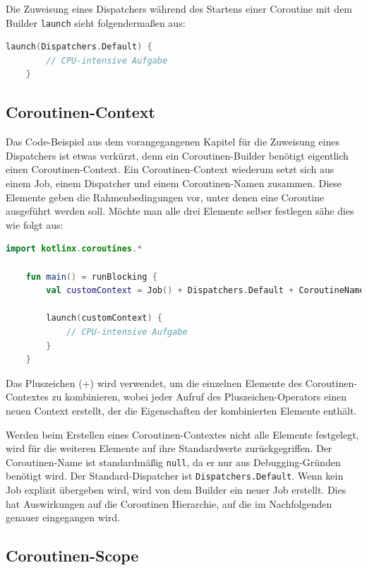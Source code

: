 \documentclass[fontsize=12pt,paper=a4,twoside=semi,parskip=half-,headsepline,headinclude]{scrreprt}
\begin{document}
Die Zuweisung eines Dispatchers während des Startens einer Coroutine mit dem Builder \texttt{launch} sieht folgendermaßen aus:

\begin{lstlisting}[language=Kotlin]
	launch(Dispatchers.Default) {
		// CPU-intensive Aufgabe
	}
\end{lstlisting}

\subsection{Coroutinen-Context}
\label{subsec:coroutinecontext}

Das Code-Beispiel aus dem vorangegangenen Kapitel für die Zuweisung eines Dispatchers ist etwas verkürzt, denn ein Coroutinen-Builder benötigt eigentlich einen Coroutinen-Context. Ein Coroutinen-Context wiederum setzt sich aus einem Job, einem Dispatcher und einem Coroutinen-Namen zusammen. Diese Elemente geben die Rahmenbedingungen vor, unter denen eine Coroutine ausgeführt werden soll. Möchte man alle drei Elemente selber festlegen sähe dies wie folgt aus:

\begin{lstlisting}[language=Kotlin]
	import kotlinx.coroutines.*

	fun main() = runBlocking {
		val customContext = Job() + Dispatchers.Default + CoroutineName("MyCoroutine")
	
		launch(customContext) {
			// CPU-intensive Aufgabe
		}
	}
\end{lstlisting}

Das Pluszeichen (+) wird verwendet, um die einzelnen Elemente des Coroutinen-Contextes zu kombinieren, wobei jeder Aufruf des Pluszeichen-Operators einen neuen Context erstellt, der die Eigenschaften der kombinierten Elemente enthält.

Werden beim Erstellen eines Coroutinen-Contextes nicht alle Elemente festgelegt, wird für die weiteren Elemente auf ihre Standardwerte zurückgegriffen. Der Coroutinen-Name ist standardmäßig \texttt{null}, da er nur aus Debugging-Gründen benötigt wird. Der Standard-Dispatcher ist \texttt{Dispatchers.Default}. Wenn kein Job explizit übergeben wird, wird von dem Builder ein neuer Job erstellt. Dies hat Auswirkungen auf die Coroutinen Hierarchie, auf die im Nachfolgenden genauer eingegangen wird.

\subsection{Coroutinen-Scope}
\label{subsec:coroutinescope}
\end{document}
